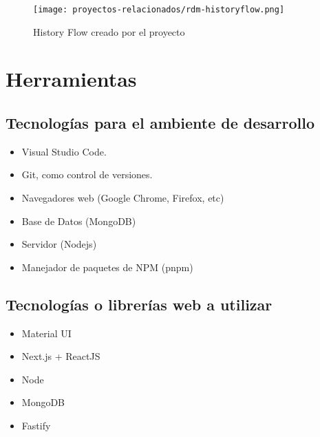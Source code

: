 \begin{figure}[H]
    \texttt{[image: proyectos-relacionados/rdm-historyflow.png]}
    \caption{History Flow creado por el proyecto}
    \label{fig:rdm-historyflow}
\end{figure}


\section{Herramientas}

\subsection{Tecnologías para el ambiente de desarrollo}
\begin{itemize}
    \item Visual Studio Code.
    \item Git, como control de versiones.
    \item Navegadores web (Google Chrome, Firefox, etc)
    \item Base de Datos (MongoDB)
    \item Servidor (Nodejs)
    \item Manejador de paquetes de NPM (pnpm)
\end{itemize}

\subsection{Tecnologías o librerías web a utilizar}
\begin{itemize}
    \item Material UI
    \item Next.js + ReactJS
    \item Node
    \item MongoDB
    \item Fastify
\end{itemize}

